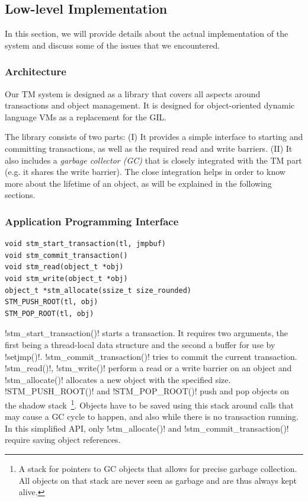 \documentclass{sigplanconf}
\makeatletter
\renewcommand\lstinline[1][]{%
  \Collectverb{\@@myverb}%
}
\def\@@myverb#1{%
    \begingroup
    \fboxsep=0.2em
    \colorbox{verylightgray}{\oldlstinline|#1|}%
    \endgroup
}
\makeatother
\begin{document}
\subsection{Low-level Implementation\label{sub:Low-level-Implementation}}

In this section, we will provide details about the actual
implementation of the system and discuss some of the issues that we
encountered.


\subsubsection{Architecture}

Our TM system is designed as a library that covers all aspects around
transactions and object management. It is designed for object-oriented
dynamic language VMs as a replacement for the GIL.

The library consists of two parts: (I) It provides a simple interface
to starting and committing transactions, as well as the required read
and write barriers. (II) It also includes a \emph{garbage collector
(GC)} that is closely integrated with the TM part (e.g. it shares the
write barrier). The close integration helps in order to know more
about the lifetime of an object, as will be explained in the following
sections.


\subsubsection{Application Programming Interface\label{sub:Application-Programming-Interfac}}

\begin{lstlisting}
void stm_start_transaction(tl, jmpbuf)
void stm_commit_transaction()
void stm_read(object_t *obj)
void stm_write(object_t *obj)
object_t *stm_allocate(ssize_t size_rounded)
STM_PUSH_ROOT(tl, obj)
STM_POP_ROOT(tl, obj)
\end{lstlisting}


\lstinline!stm_start_transaction()!  starts a transaction. It requires
two arguments, the first being a thread-local data structure and the
second a buffer for use by \lstinline!setjmp()!.
\lstinline!stm_commit_transaction()!  tries to commit the current
transaction. \lstinline!stm_read()!, \lstinline!stm_write()!  perform
a read or a write barrier on an object and \lstinline!stm_allocate()!
allocates a new object with the specified size.
 \lstinline!STM_PUSH_ROOT()!  and \lstinline!STM_POP_ROOT()!  push
and pop objects on the shadow stack~\footnote{A stack for pointers to
  GC objects that allows for precise garbage collection. All objects
  on that stack are never seen as garbage and are thus always kept
  alive.}.  Objects have to be saved using this stack around calls
that may cause a GC cycle to happen, and also while there is no
transaction running. In this simplified API, only
\lstinline!stm_allocate()!  and \lstinline!stm_commit_transaction()!
require saving object references.
\end{document}
